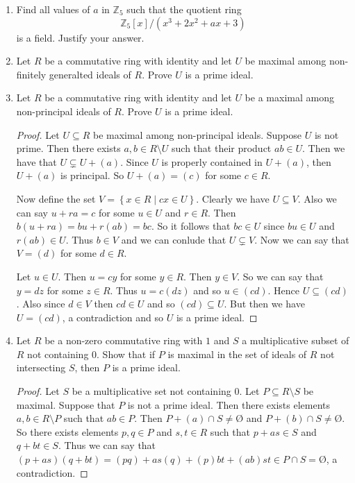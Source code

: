 \documentclass{article}
\theoremstyle{definition}
\newcommand{\Z}{\mathbb{Z}}
\newcommand{\set}[1]{\left\{#1\right\}}
\newcommand{\es}{\text{\O}}
\begin{document}
\begin{enumerate}
            \item Find all values of $a$ in $\Z_5$ such that the quotient ring \[\Z_5[x]/(x^3+2x^2+ax+3)\] is a field. Justify your answer.
            
            \item Let $R$ be a commutative ring with identity and let $U$ be maximal among non-finitely generalted ideals of $R$. Prove $U$ is a prime ideal.
        

            \item Let $R$ be a commutative ring with identity and let $U$ be a maximal among non-principal ideals of $R$. Prove $U$ is a prime ideal. 
            
            \begin{proof}
                Let $U\subseteq R$ be maximal among non-principal ideals. Suppose $U$ is not prime. Then there exists $a,b\in R\setminus U$ such that their product $ab\in U$. Then we have that $U\subsetneq U+(a)$. Since $U$ is properly contained in $U+(a)$, then $U+(a)$ is principal. So $U+(a)=(c)$ for some $c\in R$. 

                Now define the set $V=\set{x\in R \mid cx\in U}$. Clearly we have $U\subseteq V$. Also we can say $u+ra=c$ for some $u\in U$ and $r\in R$. Then $b(u+ra)=bu+r(ab)=bc$. So it follows that $bc\in U$ since $bu\in U$ and $r(ab)\in U$. Thus $b\in V$ and we can conlude that $U\subsetneq V$. Now we can say that $V=(d)$ for some $d\in R$. 

                Let $u\in U$. Then $u=cy$ for some $y\in R$. Then $y\in V$. So we can say that $y=dz$ for some $z\in R$. Thus $u=c(dz)$ and so $u\in (cd)$. Hence $U\subseteq (cd)$. Also since $d\in V$ then $cd\in U$ and so $(cd)\subseteq U$. But then we have $U=(cd)$, a contradiction and so $U$ is a prime ideal. 
            \end{proof}

            \item Let $R$ be a non-zero commutative ring with $1$ and $S$ a multiplicative subset of $R$ not containing $0$. Show that if $P$ is maximal in the set of ideals of $R$ not intersecting $S$, then $P$ is a prime ideal.
            
            \begin{proof}
                Let $S$ be a multiplicative set not containing $0$. Let $P\subseteq R\setminus S$ be maximal. Suppose that $P$ is not a prime ideal. Then there exists elements $a,b\in R\setminus P$ such that $ab\in P$. Then $P+(a)\cap S \neq \es$ and $P+(b)\cap S \neq \es$. So there exists elements $p,q\in P$ and $s,t\in R$ such that $p+as\in S$ and $q+bt\in S$. Thus we can say that $(p+as)(q+bt)=(pq)+as(q)+(p)bt+(ab)st\in P\cap S=\es $, a contradiction.
            \end{proof}


\end{enumerate}
\end{document}
